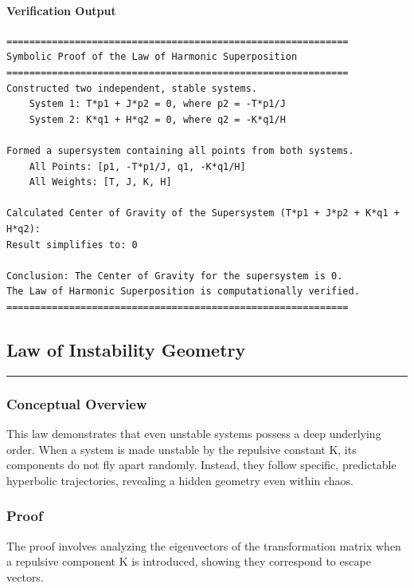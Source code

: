 \paragraph{Verification Output}
\begin{verbatim}
============================================================
Symbolic Proof of the Law of Harmonic Superposition
============================================================
Constructed two independent, stable systems.
    System 1: T*p1 + J*p2 = 0, where p2 = -T*p1/J
    System 2: K*q1 + H*q2 = 0, where q2 = -K*q1/H

Formed a supersystem containing all points from both systems.
    All Points: [p1, -T*p1/J, q1, -K*q1/H]
    All Weights: [T, J, K, H]

Calculated Center of Gravity of the Supersystem (T*p1 + J*p2 + K*q1 + H*q2):
Result simplifies to: 0

Conclusion: The Center of Gravity for the supersystem is 0.
The Law of Harmonic Superposition is computationally verified.
============================================================
\end{verbatim}


\subsection*{Law of Instability Geometry}
\hrule
\vspace{0.3cm}
\vspace{0.5cm}

\subsubsection*{Conceptual Overview}
This law demonstrates that even unstable systems possess a deep underlying order. When a system is made unstable by the repulsive constant K, its components do not fly apart randomly. Instead, they follow specific, predictable hyperbolic trajectories, revealing a hidden geometry even within chaos.

\subsubsection*{Proof}
The proof involves analyzing the eigenvectors of the transformation matrix when a repulsive component K is introduced, showing they correspond to escape vectors.


